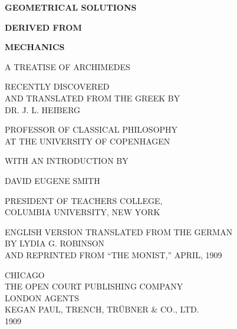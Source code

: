 \documentclass[oneside,12pt]{book}
\begin{document}
    
\frontmatter

\begin{titlepage}
    \centering
    {\Huge \textbf{GEOMETRICAL SOLUTIONS}\par} 
    {\Large \textbf{DERIVED FROM} \par}
    {\Huge \textbf{MECHANICS} \par}
    {\LARGE A TREATISE OF ARCHIMEDES \par}
    \vspace{0.25cm}
    {\large RECENTLY DISCOVERED\\AND TRANSLATED FROM THE GREEK BY\\DR. J. L. HEIBERG \par}
    {\normalsize PROFESSOR OF CLASSICAL PHILOSOPHY\\AT THE UNIVERSITY OF COPENHAGEN \par}
    \vspace{0.25cm}
    {\large WITH AN INTRODUCTION BY \par}
    {\Large DAVID EUGENE SMITH \par}
    {\normalsize PRESIDENT OF TEACHERS COLLEGE,\\COLUMBIA UNIVERSITY, NEW YORK \par}
    \vspace{0.15cm}
    {\large ENGLISH VERSION TRANSLATED FROM THE GERMAN\\BY LYDIA G. ROBINSON\\AND REPRINTED FROM ``THE MONIST,'' APRIL, 1909 \par} 
    
    {\large CHICAGO\\THE OPEN COURT PUBLISHING COMPANY\\LONDON AGENTS\\KEGAN PAUL, TRENCH, TR\"UBNER \& CO., LTD.\\1909 \par}
\end{titlepage}
\end{document}
